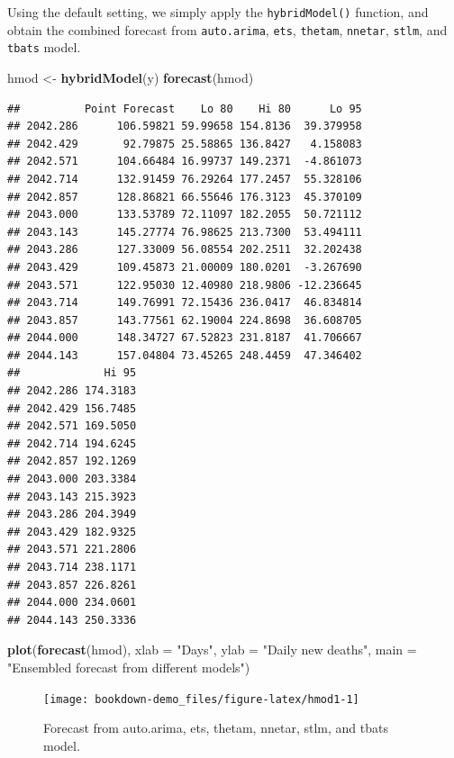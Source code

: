 \documentclass[]{book}
\newenvironment{Shaded}{\begin{snugshade}}{\end{snugshade}}
\newcommand{\KeywordTok}[1]{\textcolor[rgb]{0.13,0.29,0.53}{\textbf{#1}}}
\newcommand{\DataTypeTok}[1]{\textcolor[rgb]{0.13,0.29,0.53}{#1}}
\newcommand{\StringTok}[1]{\textcolor[rgb]{0.31,0.60,0.02}{#1}}
\newcommand{\NormalTok}[1]{#1}
\begin{document}
Using the default setting, we simply apply the \texttt{hybridModel()}
function, and obtain the combined forecast from \texttt{auto.arima},
\texttt{ets}, \texttt{thetam}, \texttt{nnetar}, \texttt{stlm}, and
\texttt{tbats} model.

\begin{Shaded}
\begin{Highlighting}[]
\NormalTok{hmod <-}\StringTok{ }\KeywordTok{hybridModel}\NormalTok{(y)}
\KeywordTok{forecast}\NormalTok{(hmod)}
\end{Highlighting}
\end{Shaded}

\begin{verbatim}
##          Point Forecast    Lo 80    Hi 80      Lo 95
## 2042.286      106.59821 59.99658 154.8136  39.379958
## 2042.429       92.79875 25.58865 136.8427   4.158083
## 2042.571      104.66484 16.99737 149.2371  -4.861073
## 2042.714      132.91459 76.29264 177.2457  55.328106
## 2042.857      128.86821 66.55646 176.3123  45.370109
## 2043.000      133.53789 72.11097 182.2055  50.721112
## 2043.143      145.27774 76.98625 213.7300  53.494111
## 2043.286      127.33009 56.08554 202.2511  32.202438
## 2043.429      109.45873 21.00009 180.0201  -3.267690
## 2043.571      122.95030 12.40980 218.9806 -12.236645
## 2043.714      149.76991 72.15436 236.0417  46.834814
## 2043.857      143.77561 62.19004 224.8698  36.608705
## 2044.000      148.34727 67.52823 231.8187  41.706667
## 2044.143      157.04804 73.45265 248.4459  47.346402
##             Hi 95
## 2042.286 174.3183
## 2042.429 156.7485
## 2042.571 169.5050
## 2042.714 194.6245
## 2042.857 192.1269
## 2043.000 203.3384
## 2043.143 215.3923
## 2043.286 204.3949
## 2043.429 182.9325
## 2043.571 221.2806
## 2043.714 238.1171
## 2043.857 226.8261
## 2044.000 234.0601
## 2044.143 250.3336
\end{verbatim}

\begin{Shaded}
\begin{Highlighting}[]
\KeywordTok{plot}\NormalTok{(}\KeywordTok{forecast}\NormalTok{(hmod), }\DataTypeTok{xlab =} \StringTok{"Days"}\NormalTok{, }\DataTypeTok{ylab =} \StringTok{"Daily new deaths"}\NormalTok{,}
     \DataTypeTok{main =} \StringTok{"Ensembled forecast from different models"}\NormalTok{)}
\end{Highlighting}
\end{Shaded}

\begin{figure}

{\centering \texttt{[image: bookdown-demo\_files/figure-latex/hmod1-1]} 

}

\caption{Forecast from auto.arima, ets, thetam, nnetar, stlm, and tbats model.}\label{fig:hmod1}
\end{figure}
\end{document}

